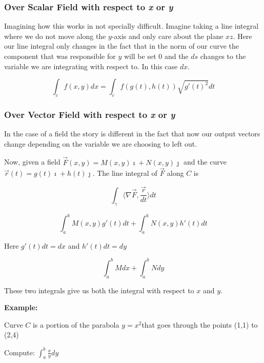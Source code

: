 \subsubsection{Over Scalar Field with respect to \emph{x} or \emph{y}}

Imagining how this works in not specially difficult. Imagine taking a line integral where we do not move 
along the \(y\)-axis and only care about the plane \(xz\). Here our line integral only changes in the fact that in 
the norm of our curve the component that was responsible for \(y\) will be set 0 and the \(ds\) changes to 
the variable we are integrating with respect to. In this case \(dx\).

\[
    \int_{c} f(x,y)dx = \int_{c} f(g(t), h(t)) \sqrt{g'(t)^2}dt 
\]

\subsubsection{Over Vector Field with respect to \emph{x} or \emph{y}}

In the case of a field the story is different in the fact that now our output vectors change depending on the 
variable we are choosing to left out.
\vspace{\baselineskip}

Now, given a field \(\vec{F}(x,y) = M(x,y)\imath + N(x,y)\jmath\) and the curve \(\vec{r}(t) = g(t)\imath + h(t)\jmath\). 
The line integral of \(\vec{F}\) along \(C\) is 

\[
    \int_\gamma \langle \nabla \vec{F}, \frac{\vec{r}}{dt} \rangle dt
\]

\[
    \int_{a}^{b} M(x,y)g'(t)dt + \int_{a}^{b} N(x,y)h'(t)dt
\]

Here \(g'(t)dt = dx\) and \(h'(t)dt = dy\)

\[
    \int_{a}^{b} Mdx + \int_{a}^{b} Ndy
\]

These two integrals give us both the integral with respect to \(x\) and \(y\).
\vspace{\baselineskip}

\textbf{Example:}
\vspace{\baselineskip}

Curve \(C\) is a portion of the parabola \(y = x^2\)that goes through the points (1,1) to (2,4)
\vspace{\baselineskip}

Compute: \(\int_{a}^{b} \frac{x}{y} dy\)
\vspace{\baselineskip}

